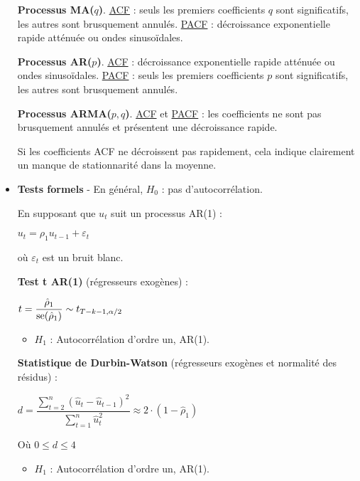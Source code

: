 \begin{f}[Détection]
\begin{itemize}[leftmargin=*]
	
	\textbf{Processus MA($q$)}. \underline{ACF} : seuls les premiers coefficients $q$ sont significatifs, les autres sont brusquement annulés. \underline{PACF} : décroissance exponentielle rapide atténuée ou ondes sinusoïdales.
	
	\textbf{Processus AR($p$)}. \underline{ACF} : décroissance exponentielle rapide atténuée ou ondes sinusoïdales. \underline{PACF} : seuls les premiers coefficients $p$ sont significatifs, les autres sont brusquement annulés.

	
	\textbf{Processus ARMA($p, q$)}. \underline{ACF} et \underline{PACF} : les coefficients ne sont pas brusquement annulés et présentent une décroissance rapide.
	
	Si les coefficients ACF ne décroissent pas rapidement, cela indique clairement un manque de stationnarité dans la moyenne.
	
	\item \textbf{Tests formels} - En général, $H_{0}$ : pas d'autocorrélation.
	
	En supposant que $u_{t}$ suit un processus AR(1) :
	
	\begin{center}
		$u_{t} = \rho_{1} u_{t - 1} + \varepsilon_{t}$
	\end{center}
	
	où $\varepsilon_{t}$ est un bruit blanc.
	
	\textbf{Test t AR(1)} (régresseurs exogènes) :
	
	\begin{center}
		$t = \dfrac{\hat{\rho}_{1}}{\mathrm{se}(\hat{\rho}_{1})} \sim t_{T - k - 1, \alpha/2}$
	\end{center}
	
	\begin{itemize}[leftmargin=*]
		\item $H_{1}$ : Autocorrélation d'ordre un, AR(1).
	\end{itemize}
	
	\textbf{Statistique de Durbin-Watson} (régresseurs exogènes et normalité des résidus) :
	
	\begin{center}
		$d = \dfrac{\sum_{t=2}^{n} (\hat{u}_{t} - \hat{u}_{t - 1})^{2}}{\sum_{t=1}^{n} \hat{u}_{t}^{2}} \approx 2 \cdot (1 - \hat{\rho}_{1})$
	\end{center}
	
	Où $0 \leq d \leq 4$
	
	\begin{itemize}[leftmargin=*]
		\item $H_{1}$ : Autocorrélation d'ordre un, AR(1).
	\end{itemize}
	

\end{itemize}
\end{f}
